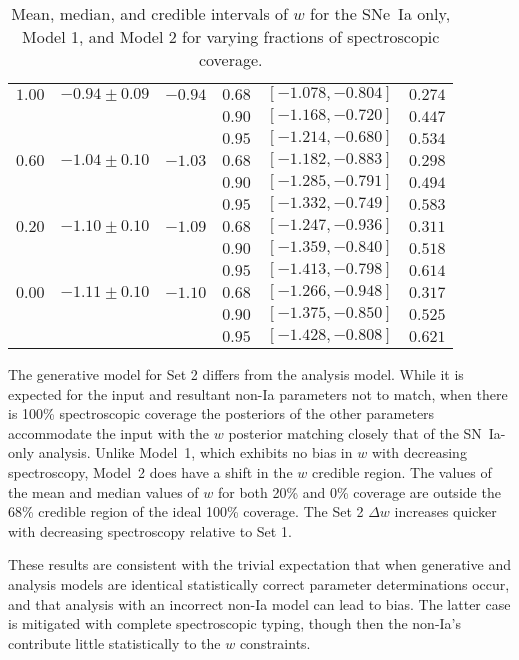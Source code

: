 \documentclass[preprint,3p]{elsarticle}
\begin{document}
\begin{table}
\begin{tabular}{|c|cc|ccc|}
$1.00$ &$-0.94 \pm  0.09$ &$-0.94$ &$0.68$ & $[-1.078, -0.804]$ & $0.274$ \\
&&&$0.90$ & $[-1.168, -0.720]$ & $0.447$ \\
&&&$0.95$ & $[-1.214, -0.680]$ & $0.534$ \\
\hline
$0.60$ &$-1.04 \pm  0.10$ & $-1.03$ &$0.68$ & $[-1.182, -0.883]$ & $0.298$ \\
& & &$0.90$ & $[-1.285, -0.791]$ & $0.494$ \\
& & &$0.95$ & $[-1.332, -0.749]$ & $0.583$ \\
\hline
$0.20$ &$-1.10 \pm  0.10$ & $-1.09$ &$0.68$ & $[-1.247, -0.936]$ & $0.311$ \\
& & &$0.90$ & $[-1.359, -0.840]$ & $0.518$ \\
& & &$0.95$ & $[-1.413, -0.798]$ & $0.614$ \\
\hline
$0.00$ &$-1.11 \pm  0.10$ & $-1.10$ &$0.68$ & $[-1.266, -0.948]$ & $0.317$ \\
& & &$0.90$ & $[-1.375, -0.850]$ & $0.525$ \\
& & &$0.95$ & $[-1.428, -0.808]$ & $0.621$ \\
\hline
\end{tabular}
\caption{Mean, median, and credible intervals of $w$ for the SNe~Ia only,
Model 1, and Model 2 for varying
fractions of spectroscopic coverage. \label{seed2:tab}}
\end{table}

The generative model for Set 2 differs from the analysis model.
While it is expected for the input and resultant non-Ia parameters not to match, 
when there is 100\% spectroscopic coverage the posteriors of the other
parameters accommodate the input with the $w$ posterior matching
closely that of the SN~Ia-only analysis.  Unlike Model~1, which exhibits no bias
in $w$ with decreasing spectroscopy, Model~2 does have a shift in the $w$
credible region.  
The values of the mean and median values of
$w$ for both 20\% and 0\% coverage are outside the 68\%
credible region of the ideal 100\% coverage.
The Set 2 $\Delta w$ increases quicker with decreasing spectroscopy
relative to Set 1.

These results are consistent with the trivial expectation that when generative
and analysis models are identical statistically correct parameter determinations
occur, and that analysis with an incorrect non-Ia model can lead to bias.
The latter case is mitigated with complete spectroscopic typing, though then
the non-Ia's contribute little statistically to the $w$ constraints. 




 

\end{document}
